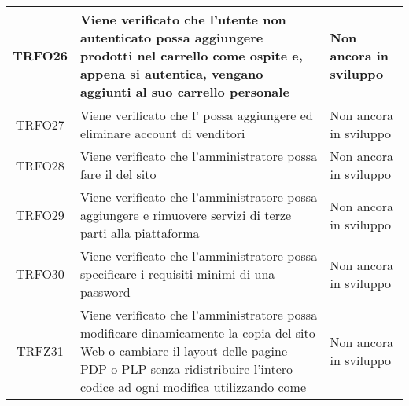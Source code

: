 \begin{longtable}{|c| C{10cm} |C{3cm}|}
    TRFO26 & Viene verificato che l'utente non autenticato possa aggiungere prodotti nel carrello come ospite e, appena si autentica, vengano aggiunti al suo carrello personale & Non ancora in sviluppo \\ \hline
    TRFO27 & Viene verificato che l' possa aggiungere ed eliminare account di venditori & Non ancora in sviluppo \\ \hline
    TRFO28 & Viene verificato che l'amministratore possa fare il  del sito & Non ancora in sviluppo \\ \hline
    TRFO29 & Viene verificato che l'amministratore possa aggiungere e rimuovere servizi di terze parti alla piattaforma & Non ancora in sviluppo \\ \hline
    TRFO30 & Viene verificato che l'amministratore possa specificare i requisiti minimi di una password & Non ancora in sviluppo \\ \hline
    TRFZ31 & Viene verificato che l'amministratore possa modificare dinamicamente la copia del sito Web o cambiare il layout delle pagine PDP o PLP senza ridistribuire l'intero codice ad ogni modifica utilizzando  come  & Non ancora in sviluppo \\ \hline
    
\end{longtable}
